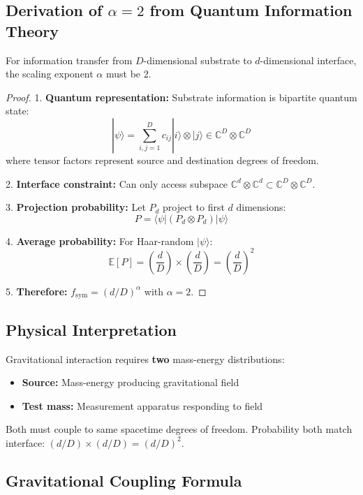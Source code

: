 \documentclass[11pt,titlepage]{article}
\begin{document}
\subsection{Derivation of $\alpha=2$ from Quantum Information Theory}

\begin{tcolorbox}[colback=green!5!white,colframe=green!75!black,title=Theorem (α=2 from Quantum Bipartite Structure)]
For information transfer from $D$-dimensional substrate to $d$-dimensional interface, the scaling exponent $\alpha$ must be 2.
\end{tcolorbox}

\begin{proof}
1. \textbf{Quantum representation:} Substrate information is bipartite quantum state:
\[
|\psi\rangle = \sum_{i,j=1}^{D} c_{ij} |i\rangle \otimes |j\rangle \in \mathbb{C}^D \otimes \mathbb{C}^D
\]
where tensor factors represent source and destination degrees of freedom.

2. \textbf{Interface constraint:} Can only access subspace $\mathbb{C}^d \otimes \mathbb{C}^d \subset \mathbb{C}^D \otimes \mathbb{C}^D$.

3. \textbf{Projection probability:} Let $P_d$ project to first $d$ dimensions:
\[
P = \langle \psi | (P_d \otimes P_d) | \psi \rangle
\]

4. \textbf{Average probability:} For Haar-random $|\psi\rangle$:
\[
\mathbb{E}[P] = \left(\frac{d}{D}\right) \times \left(\frac{d}{D}\right) = \left(\frac{d}{D}\right)^2
\]

5. \textbf{Therefore:} $f_{\mathrm{sym}} = (d/D)^\alpha$ with $\alpha = 2$.
\end{proof}

\subsection{Physical Interpretation}

Gravitational interaction requires \textbf{two} mass-energy distributions:
\begin{itemize}
\item \textbf{Source:} Mass-energy producing gravitational field
\item \textbf{Test mass:} Measurement apparatus responding to field
\end{itemize}

Both must couple to same spacetime degrees of freedom. Probability both match interface: $(d/D) \times (d/D) = (d/D)^2$.

\subsection{Gravitational Coupling Formula}
\end{document}
